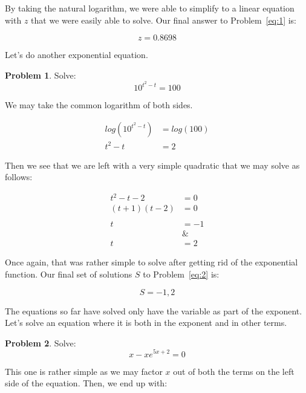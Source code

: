\documentclass[12pt]{article}
\theoremstyle{definition}
\newtheorem{problem}{Problem}
\begin{document}
By taking the natural logarithm, we were able to simplify to a linear equation with $z$ that we were easily able to solve.
Our final answer to Problem~\eqref{eq:1} is:

\begin{equation}
    z = 0.8698
\end{equation}

Let's do another exponential equation.

\begin{problem}
Solve:
\begin{equation*}
    10^{t^2-t} = 100 \label{eq:2}
\end{equation*}
\end{problem}

We may take the common logarithm of both sides.

\begin{align}
    log(10^{t^2-t}) & = log(100) \\
    t^2-t           & = 2
\end{align}

Then we see that we are left with a very simple quadratic that we may solve as follows:

\begin{align}
    t^2-t-2    & = 0  \\
    (t+1)(t-2) & = 0  \\
    \nonumber         \\
    t          & = -1 \\
               & \&   \\
    t          & = 2
\end{align}

Once again, that was rather simple to solve after getting rid of the exponential function.
Our final set of solutions $S$ to Problem~\eqref{eq:2} is:

\begin{equation}
    S = {-1, 2}
\end{equation}

The equations so far have solved only have the variable as part of the exponent.
Let's solve an equation where it is both in the exponent and in other terms.

\begin{problem}
Solve:
\begin{equation*}
    x - xe^{5x+2} = 0 \label{eq:3}
\end{equation*}
\end{problem}

This one is rather simple as we may factor $x$ out of both the terms on the left side of the equation.
Then, we end up with:
\end{document}
